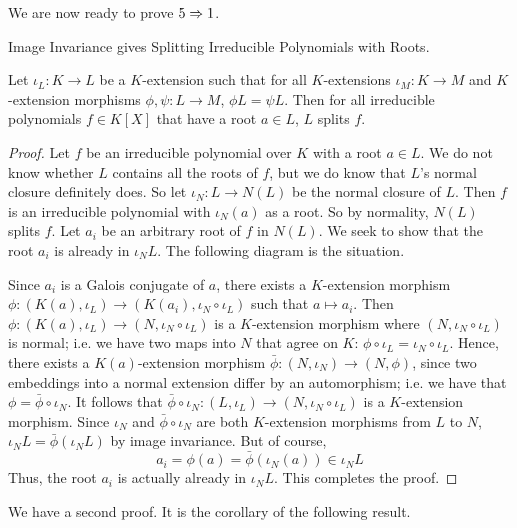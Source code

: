 \documentclass[../book.tex]{subfiles}
\begin{document}
We are now ready to prove $5 \Rightarrow 1$. 
\begin{thm} Image Invariance gives Splitting Irreducible Polynomials with Roots.
    
    Let $\iota_L : K \to L$ be a $K$-extension such that
    for all $K$-extensions $\iota_M : K \to M$ and 
    $K$-extension morphisms $\phi, \psi : L \to M$, $\phi L = \psi L$. 
    Then for all irreducible polynomials $f \in K[X]$ that have a root $a \in L$, 
    $L$ splits $f$. 
\end{thm}
\begin{proof}
    Let $f$ be an irreducible polynomial over $K$ with a root $a \in L$. 
    We do not know whether $L$ contains all the roots of $f$, 
    but we do know that $L$'s normal closure definitely does. 
    So let $\iota_N : L \to N(L)$ be the normal closure of $L$. 
    Then $f$ is an irreducible polynomial with $\iota_N(a)$ as a root.
    So by normality, $N(L)$ splits $f$. 
    Let $a_i$ be an arbitrary root of $f$ in $N(L)$. 
    We seek to show that the root $a_i$ is already in $\iota_N L$. 
    The following diagram is the situation. 
    \begin{figure} [H]
        \centering
    \end{figure}
    Since $a_i$ is a Galois conjugate of $a$, 
    there exists a $K$-extension morphism 
    $\phi : (K(a),\iota_L) \to (K(a_i),\iota_N\circ\iota_L)$ 
    such that $a \mapsto a_i$. 
    Then $\phi : (K(a),\iota_L) \to (N,\iota_N\circ\iota_L)$
    is a $K$-extension morphism where $(N,\iota_N\circ\iota_L)$ is normal;
    i.e. we have two maps into $N$ that agree on 
    $K$: $\phi \circ \iota_L = \iota_N \circ \iota_L$.
    Hence, there exists a $K(a)$-extension morphism 
    $\bar\phi : (N,\iota_N) \to (N,\phi)$,
    since two embeddings into a normal extension differ by an automorphism;
    i.e. we have that $\phi = \bar\phi \circ \iota_N$.
    It follows that 
    $\bar\phi\circ\iota_N : (L,\iota_L) \to (N,\iota_N\circ\iota_L)$
    is a $K$-extension morphism. 
    Since $\iota_N$ and $\bar\phi\circ\iota_N$ are 
    both $K$-extension morphisms from $L$ to $N$,
    $\iota_N L = \bar\phi(\iota_N L)$ by image invariance.
    But of course, 
    \[ a_i = \phi(a) = \bar\phi(\iota_N(a)) \in \iota_N L\]
    Thus, the root $a_i$ is actually already in $\iota_N L$.
    This completes the proof. 
\end{proof}
We have a second proof. 
It is the corollary of the following result.
\end{document}
